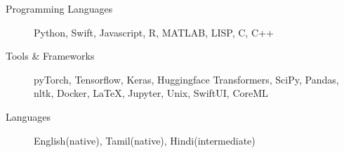 \begin{description}
\item[Programming Languages] Python, Swift, Javascript, R, MATLAB, LISP, C, C++

\item[Tools \& Frameworks] pyTorch, Tensorflow, Keras, Huggingface Transformers, SciPy, Pandas, nltk, Docker, \LaTeX, Jupyter, Unix, SwiftUI, CoreML

\item[Languages] English(native), Tamil(native), Hindi(intermediate)
\end{description}
